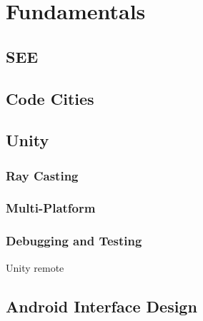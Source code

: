 \section{Fundamentals}
\label{sec:fundamentals}

\subsection{SEE}
\subsection{Code Cities}
\subsection{Unity}
\subsubsection{Ray Casting}
\label{sec:ray}
\subsubsection{Multi-Platform}
\subsubsection{Debugging and Testing}
Unity remote
\subsection{Android Interface Design}
